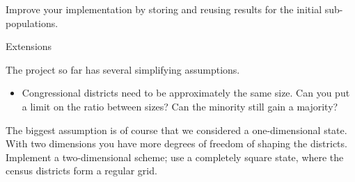 \begin{exercise}
  Improve your implementation by storing and reusing results for the
  initial sub-populations.
\end{exercise}

 {Extensions}

The project so far has several simplifying assumptions.
\begin{itemize}
\item Congressional districts need to be approximately the same
  size. Can you put a limit on the ratio between sizes? Can the
  minority still gain a majority?
\end{itemize}

\begin{exercise}
  The biggest assumption is of course that we considered a
  one-dimensional state. With two dimensions you have more degrees of
  freedom of shaping the districts. Implement a two-dimensional
  scheme; use a completely square state, where the census districts
  form a regular grid.
\end{exercise}
